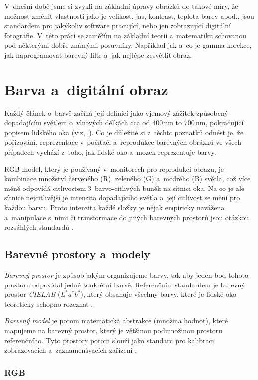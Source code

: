 \documentclass[11pt, a4paper, titlepage]{article}
\begin{document}
V~dnešní době jsme si zvykli na základní úpravy obrázků do takové míry, že možnost změnit vlastnosti jako je velikost, jas, kontrast, teplota barev apod., jsou standardem pro jakýkoliv software pracující, nebo jen zobrazující digitální fotografie.
V~této práci se zaměřím na základní teorii a~matematiku schovanou pod některými dobře známými posuvníky.
Například jak a~co je gamma korekce, jak naprogramovat barevný filtr a~jak nejlépe zesvětlit obraz.

\section{Barva a~digitální obraz}
Každý článek o~barvě začíná její definicí jako vjemový zážitek způsobený dopadajícím světlem o~vlnových délkách cca od 400\,nm to 700\,nm, pokračující popisem lidského oka (viz, \cite{wiki:Color},\cite{mul_opora}).
Co je důležité si z~těchto poznatků odnést je, že pořizování, reprezentace v~počítači a~reprodukce barevných obrázků ve všech případech vychází z~toho, jak lidské oko a~mozek reprezentuje barvy.

RGB model, který je používaný v~monitorech pro reprodukci obrazu, je kombinace množství červeného (R), zeleného (G) a~modrého (B) světla, což více méně odpovídá citlivostem 3~barvo-citlivých buněk na sítnici oka.
Na co je ale sítnice nejcitlivější je intenzita dopadajícího světla a~její citlivost se mění pro každou barvu.
Proto intenzita každé složky je nějak empiricky navážena a~manipulace s~nimi či transformace do jiných barevných prostorů jsou otázkou rozsáhlých standardů \cite{wiki:Color_space}.
   
\subsection{Barevné prostory a~modely} \label{color_spaces}
\emph{Barevný prostor} je způsob jakým organizujeme barvy, tak aby jeden bod tohoto prostoru odpovídal jedné konkrétní barvě.
Referenčním standardem je barevný prostor \emph{CIELAB} ($L^*a^*b^*$), který obsahuje všechny barvy, které je lidské oko teoreticky schopno rozeznat \cite{wiki:CIELAB_color_space}.

\emph{Barvený model} je potom matematická abstrakce (množina hodnot), které mapujeme na barevný prostor, který je většinou podmnožinou prostoru referenčního.
Tyto prostory potom slouží jako standard pro kalibraci zobrazovacích a~zaznamenávacích zařízení \cite{wiki:Color_space}.

\subsubsection{RGB}
\end{document}
